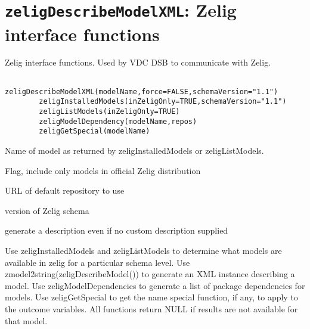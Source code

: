  \section{{\tt zeligDescribeModelXML}: Zelig interface functions}\label{ss:zeligDescribeModelXML}
\begin{Description}\relax
Zelig interface functions. Used by VDC DSB to  communicate with Zelig.
\end{Description}
\begin{Usage}
\begin{verbatim}
        zeligDescribeModelXML(modelName,force=FALSE,schemaVersion="1.1")
        zeligInstalledModels(inZeligOnly=TRUE,schemaVersion="1.1")
        zeligListModels(inZeligOnly=TRUE) 
        zeligModelDependency(modelName,repos) 
        zeligGetSpecial(modelName)
\end{verbatim}
\end{Usage}
\begin{Arguments}
\begin{ldescription}
\item[\code{modelName}] Name of model as returned by zeligInstalledModels or zeligListModels.
\item[\code{inZeligOnly}] Flag, include only models in official Zelig distribution
\item[\code{repos}] URL of default repository to use
\item[\code{schemaVersion}] version of Zelig schema
\item[\code{force}] generate a description even if no custom description supplied
\end{ldescription}
\end{Arguments}
\begin{Value}
Use zeligInstalledModels and zeligListModels to determine what models are available in zelig
for a particular schema level. Use zmodel2string(zeligDescribeModel()) to generate an XML
instance describing a model. Use zeligModelDependencies to generate a list of package
dependencies for models. Use zeligGetSpecial to get the name special function, if any,
to apply to the outcome variables. All functions return NULL if results are
not available for that model.
\end{Value}

